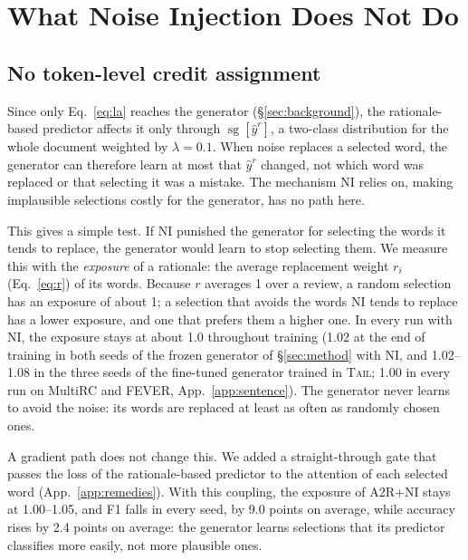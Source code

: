 \documentclass[11pt]{article}
\newcommand{\TAIL}{\textup{\textsc{Tail}}}
\newcommand{\sg}{\operatorname{sg}}
\begin{document}
\section{What Noise Injection Does Not Do}
\label{sec:analysis}

\subsection{No token-level credit assignment}
\label{sec:credit}

Since only Eq.~\ref{eq:la} reaches the generator (\S\ref{sec:background}), the rationale-based predictor affects it only through $\sg[\hat{y}^r]$, a two-class distribution for the whole document weighted by $\lambda = 0.1$. When noise replaces a selected word, the generator can therefore learn at most that $\hat{y}^r$ changed, not which word was replaced or that selecting it was a mistake. The mechanism NI relies on, making implausible selections costly for the generator, has no path here.

This gives a simple test. If NI punished the generator for selecting the words it tends to replace, the generator would learn to stop selecting them. We measure this with the \emph{exposure} of a rationale: the average replacement weight $r_i$ (Eq.~\ref{eq:r}) of its words. Because $r$ averages 1 over a review, a random selection has an exposure of about 1; a selection that avoids the words NI tends to replace has a lower exposure, and one that prefers them a higher one. In every run with NI, the exposure stays at about 1.0 throughout training (1.02 at the end of training in both seeds of the frozen generator of \S\ref{sec:method} with NI, and 1.02--1.08 in the three seeds of the fine-tuned generator trained in \TAIL; 1.00 in every run on MultiRC and FEVER, App.~\ref{app:sentence}). The generator never learns to avoid the noise: its words are replaced at least as often as randomly chosen ones.

A gradient path does not change this. We added a straight-through gate that passes the loss of the rationale-based predictor to the attention of each selected word (App.~\ref{app:remedies}). With this coupling, the exposure of A2R+NI stays at 1.00--1.05, and F1 falls in every seed, by 9.0 points on average, while accuracy rises by 2.4 points on average: the generator learns selections that its predictor classifies more easily, not more plausible ones.
\end{document}
